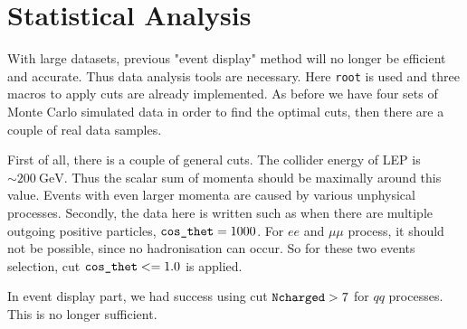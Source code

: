 \section{Statistical Analysis}
With large datasets, previous "event display" method will no longer be efficient and accurate. Thus data analysis tools are necessary. Here \verb|root| is used and three macros to apply cuts are already implemented. As before we have four sets of Monte Carlo simulated data in order to find the optimal cuts, then there are a couple of real data samples.

First of all, there is a couple of general cuts. The collider energy of LEP is $\sim\SI{200}{\giga\eV}$. Thus the scalar sum of momenta should be maximally around this value. Events with even larger momenta are caused by various unphysical processes. Secondly, the data here is written such as when there are multiple outgoing positive particles, $\verb|cos_thet|=1000$. For $ee$ and $\mu\mu$ process, it should not be possible, since no hadronisation can occur. So for these two events selection, cut $\verb|cos_thet| <= 1.0$ is applied.

In event display part, we had success using cut $\verb|Ncharged| > 7$ for $qq$ processes. This is no longer sufficient.


